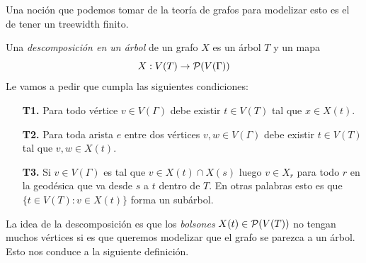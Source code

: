 \documentclass[tesis.tex]{subfiles}
\begin{document}
Una noción que podemos tomar de la teoría de grafos para modelizar esto es el de tener un treewidth finito.

\begin{deff}\label{desc-arbol}
	Una \emph{descomposición en un árbol} de un grafo $X$ es un árbol $T$ y un mapa 
	\[
	X: V(T) \to {\cal P}(V(\Gamma))
	\]
	Le vamos a pedir que cumpla las siguientes condiciones:
	\begin{enumerate}
		\item[\textbf{T1.}] Para todo vértice $v \in V(\Gamma)$ debe existir $t \in V(T)$ tal que $x \in X(t)$. 
		\item[\textbf{T2.}] Para toda arista $e$ entre dos vértices $v,w \in V(\Gamma)$ debe existir $t \in V(T)$ tal que $v,w \in X(t)$.
		\item[\textbf{T3.}] Si $v \in V(\Gamma)$ es tal que $v \in X(t) \cap X(s)$ luego $v \in X_r$ para todo $r$ en la geodésica que va desde $s$ a $t$ dentro de $T$. En otras palabras esto es que $\{ t \in V(T) :  v \in X(t) \}$ forma un subárbol. 
	\end{enumerate} 
\end{deff}
\smallskip

La idea de la descomposición es que los \emph{bolsones} $X(t) \in {\cal P}(V(T))$ no tengan muchos vértices si es que queremos modelizar que el grafo se parezca a un árbol. Esto nos conduce a la siguiente definición.
\end{document}
